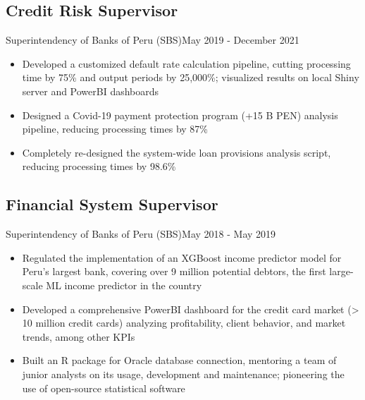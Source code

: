 \subsection{Credit Risk Supervisor}{Superintendency of Banks of Peru (SBS)}{May 2019 - December 2021}
\vspace{0.1cm}
\begin{itemize}
    \item Developed a customized default rate calculation pipeline, cutting processing time by 75\% and output periods by 25,000\%; visualized results on local Shiny server and PowerBI dashboards

    \item Designed a Covid-19 payment protection program (+15 B PEN) analysis pipeline, reducing processing times by 87\%
    
    \item Completely re-designed the system-wide loan provisions analysis script, reducing processing times by 98.6\%
    
    

    

\end{itemize}
\vspace{0.1cm}
\subsection{Financial System Supervisor}{Superintendency of Banks of Peru (SBS)}{May 2018 - May 2019}
\vspace{0.1cm}
\begin{itemize}
    \item Regulated the implementation of an XGBoost income predictor model for Peru’s largest bank, covering over 9 million potential debtors, the first large-scale ML income predictor in the country
    \item Developed a comprehensive PowerBI dashboard for the credit card market (> 10 million credit cards) analyzing profitability, client behavior, and market trends, among other KPIs
    \item Built an R package for Oracle database connection, mentoring a team of junior analysts on its usage, development and maintenance; pioneering the use of open-source statistical software


    
\end{itemize}


